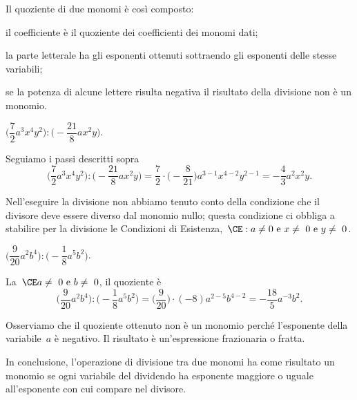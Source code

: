 \begin{procedura}
Il quoziente di due monomi è così composto:
\begin{enumeratea}
 \item il coefficiente è il quoziente dei coefficienti dei monomi dati;
 \item la parte letterale ha gli esponenti ottenuti sottraendo gli esponenti
delle stesse variabili;
 \item se la potenza di alcune lettere risulta negativa il risultato della
divisione non è un monomio.
\end{enumeratea}
\end{procedura}
\pagebreak
\begin{exrig}
 \begin{esempio}
$\bigg(\dfrac{7}{2}a^{3}x^{{4}}y^{2}\bigg):\bigg(-{\dfrac{21}{8}}ax^{2}y\bigg)$.

Seguiamo i passi descritti sopra
\[\bigg(\frac{7}{2}a^{3}x^{{4}}y^{2}\bigg):\bigg(-{\frac{21}{8}}ax^{2}y\bigg)=\frac{7}{2}\cdot%
\bigg(-{\frac{8}{21}}\bigg)a^{3-1}x^{4-2}y^{2-1}=-{\frac{4}{3}}a^{2}x^{2}y.\]

Nell'eseguire la divisione non abbiamo tenuto conto
della condizione che il divisore deve essere diverso dal monomio nullo;
questa condizione ci obbliga a stabilire per la divisione le Condizioni
di Esistenza,~$\CE:a\neq0\text{ e }x\neq~0\text{ e }y\neq~0$.
 \end{esempio}

 \begin{esempio}
$\bigg(\dfrac{9}{20}a^{2}b^{4}\bigg):\bigg(-{\dfrac{1}{8}}a^{5}b^{2}\bigg)$.

La~$\CE a\neq~0\text{ e }b\neq~0$, il quoziente è
\[\bigg(\frac{9}{20}a^{2}b^{4}\bigg):\bigg(-{\frac{1}{8}}a^{5}b^{2}\bigg)=%
\bigg(\frac{9}{20}\bigg)\cdot(-8)a^{2-5}b^{4-2}=-{\frac{18}{5}}a^{-3}b^{2}.\]

Osserviamo che il quoziente ottenuto non è un monomio perché
l'esponente della variabile~$a$ è negativo. Il
risultato è un'espressione frazionaria o fratta.
 \end{esempio}
\end{exrig}

In conclusione, l'operazione di divisione tra due monomi
ha come risultato un monomio se ogni variabile del dividendo ha
esponente maggiore o uguale all'esponente con cui
compare nel divisore.


\vspazio\ovalbox{\risolvii \ref{ese:10.20}, \ref{ese:10.21}, \ref{ese:10.22}}

